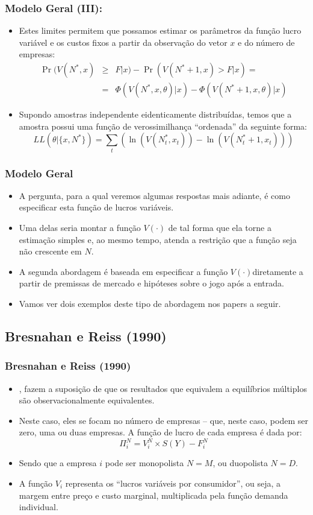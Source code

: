 \documentclass{beamer}
\begin{document}
\begin{frame}\frametitle{Modelo Geral (III):}

\begin{itemize}
\item Estes limites permitem que possamos estimar os parâmetros da função
lucro variável e os custos fixos a partir da observação do vetor $x$
e do número de empresas:
\begin{eqnarray*}
\Pr(V(N^{*},x) & \geq & F|x)-\Pr(V(N^{*}+1,x)>F|x)=\\
 & = & \Phi(V(N^{*},x,\theta)|x)-\Phi(V(N^{*}+1,x,\theta)|x)
\end{eqnarray*}
\item Supondo amostras independente eidenticamente distribuídas, temos que
a amostra possui uma função de verossimilhança ``ordenada'' da seguinte
forma:
\[
LL(\theta|\{x,N^{*}\})=\sum_{t}(\ln(V(N_{t}^{*},x_{t}))-\ln(V(N_{t}^{*}+1,x_{t})))
\]
\end{itemize}
\end{frame}

\begin{frame}\frametitle{Modelo Geral }

\begin{itemize}
\item A pergunta, para a qual veremos algumas respostas mais adiante, é
como especificar esta função de lucros variáveis. 
\item Uma delas seria montar a função $V(\cdot)$ de tal forma que ela torne
a estimação simples e, ao mesmo tempo, atenda a restrição que a função
seja não crescente em $N$. 
\item A segunda abordagem é baseada em especificar a função $V(\cdot)$diretamente
a partir de premissas de mercado e hipóteses sobre o jogo após a entrada. 
\item Vamos ver dois exemplos deste tipo de abordagem nos papers a seguir.
\end{itemize}
\end{frame}

\subsection{Bresnahan e Reiss (1990)}
\begin{frame}\frametitle{Bresnahan e Reiss (1990)}

\begin{itemize}
\item \citet{Bresnahan1990}, fazem a suposição de que os resultados
que equivalem a equilíbrios múltiplos são observacionalmente equivalentes. 
\item Neste caso, eles se focam no número de empresas -- que,
neste caso, podem ser zero, uma ou duas empresas. A função de lucro
de cada empresa é dada por:
\[
\Pi_{i}^{N}=V_{i}^{N}\times S(Y)-F_{i}^{N}
\]
\item Sendo que a empresa $i$ pode ser monopolista $N=M$, ou duopolista
$N=D$. 
\item A função $V_{i}$ representa os ``lucros variáveis por consumidor'',
ou seja, a margem entre preço e custo marginal, multiplicada pela
função demanda individual. 
\end{itemize}
\end{frame}
\end{document}
